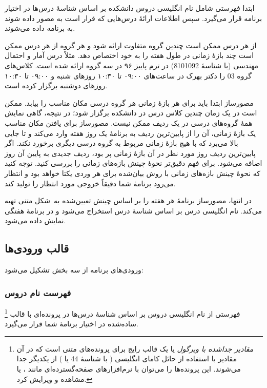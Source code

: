 \documentclass{utap}
\begin{document}
    ابتدا فهرستی شامل نام انگلیسی دروس دانشکده بر اساس شناسهٔ درس‌ها در اختیار برنامه قرار می‌گیرد. سپس اطلاعات ارائهٔ درس‌هایی که قرار است به مصور داده شوند به برنامه داده می‌شوند.

    از هر درس ممکن است چندین گروه متفاوت ارائه شود و هر گروه از هر درس ممکن است چند بازهٔ زمانی در طول هفته را به خود اختصاص دهد. مثلاً درس آمار و احتمال مهندسی (با شناسهٔ 8101092) در ترم پاییز ۹۶ در سه گروه ارائه شده است. کلاس‌های گروه 03 را دکتر بهرک در ساعت‌های ۰۹:۰۰ تا ۱۰:۳۰ روزهای شنبه و ۰۹:۰۰ تا ۱۰:۳۰ روزهای دوشنبه برگزار کرده است.

    مصورساز ابتدا باید برای هر بازهٔ زمانی هر گروه درسی مکان مناسب را بیابد. ممکن است در یک زمان چندین کلاس درس در دانشکده برگزار شود؛ در نتیجه، گاهی نمایش همهٔ گروه‌های درسی در یک ردیف ممکن نیست. مصورساز برای یافتن مکان مناسب یک بازهٔ زمانی، آن را از پایین‌ترین ردیف به برنامهٔ یک روز هفته وارد می‌کند و تا جایی بالا می‌برد که با هیچ بازهٔ زمانی مربوط به گروه درسی دیگری برخورد نکند. اگر پایین‌ترین ردیف روز مورد نظر در آن بازهٔ زمانی پر بود، ردیف جدیدی به پایین آن روز اضافه می‌شود. برای فهم دقیق‌تر نحوهٔ چینش بازه‌‌های زمانی  را بررسی کنید. توجه کنید که نحوهٔ چینش بازه‌های زمانی با روش بیان‌شده برای هر وردی یکتا خواهد بود و انتظار می‌رود برنامهٔ شما دقیقاً خروجی مورد انتظار را تولید کند.

    در انتها، مصورساز برنامهٔ هر هفته را بر اساس چینش تعیین‌شده به~شکل متنی تهیه می‌کند. نام انگلیسی درس بر اساس شناسهٔ درس استخراج می‌شود و در برنامهٔ هفتگی نمایش داده می‌شود.

    \subsection{قالب ورودی‌ها}

    ورودی‌های برنامه از سه بخش تشکیل می‌شود:

    \subsubsection{فهرست نام دروس}

    فهرستی از نام انگلیسی دروس بر اساس شناسهٔ  درس‌ها در پرونده‌ای با قالب \footnote{\textit{مقادیر جداشده با ویرگول} یا  یک قالب رایج برای پرونده‌های متنی است که در آن مقادیر با استفاده از حائل کامای انگلیسی (\lr{\texttt{,}} با شناسهٔ  44 یا ) از یکدیگر جدا می‌شوند. این پرونده‌ها را می‌توان با نرم‌افزارهای صفحه‌گسترده‌ای مانند ،  یا  مشاهده و ویرایش کرد.} ساده‌شده در اختیار برنامهٔ شما قرار می‌گیرد.
\end{document}
